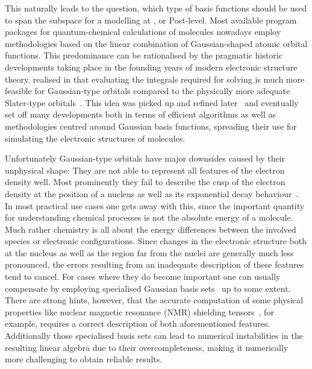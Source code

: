 This naturally leads to the question,
which type of basis functions should be used to span the subspace
for a modelling at \HF, \DFT or Post-\HF level.
Most available program packages for
quantum-chemical calculations of molecules nowadays employ methodologies based on
the linear combination of Gaussian-shaped atomic orbital functions.
This predominance can be rationalised
by the pragmatic historic developments
taking place in the founding years of modern electronic structure theory.
\citet{Boys1950} realised in \citeyear{Boys1950}
that evaluating the integrals
required for solving \HF is much more feasible for Gaussian-type orbitals
compared to the physically more adequate Slater-type orbitals~\cite{Slater1930}.
This idea was picked up and refined later~\cite{Hehre1969}
and eventually set off many developments
both in terms of efficient algorithms as well as methodologies
centred around Gaussian basis functions,
spreading their use for simulating the electronic structures of molecules.

Unfortunately Gaussian-type orbitals have major downsides
caused by their unphysical shape:
They are not able to represent
all features of the electron density well.
Most prominently they fail to describe the cusp of the electron density
at the position of a nucleus as well as its exponential decay behaviour~\cite{Kato1957}.
In most practical use cases one gets away with this,
since the important quantity for understanding chemical processes
is not the absolute energy of a molecule.
Much rather chemistry is all about the energy differences
between the involved species or electronic configurations.
Since changes in the electronic structure both at the nucleus as well as
the region far from the nuclei are generally much less pronounced,
the errors resulting from an inadequate description
of these features tend to cancel.
For cases where they do become important
one can usually compensate by employing specialised Gaussian
basis sets~\cite{Jensen2013,Hill2013} up to some extent.
There are strong hints, however,
that the accurate computation of some physical properties
like nuclear magnetic resonance (NMR) shielding tensors~\cite{Guell2008,Hoggan2009},
for example,
requires a correct description of both aforementioned features.
Additionally those specialised basis sets can lead to
numerical instabilities in the resulting linear algebra due to their overcompleteness,
making it numerically more challenging to obtain reliable results.

